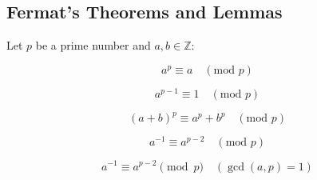 \subsection{Fermat's Theorems and Lemmas}

Let $p$ be a prime number and $a, b \in \mathbb{Z}$:

\begin{equation}
a^p \equiv a \quad (\text{mod } p)
\end{equation}

\begin{equation}
a^{p-1} \equiv 1 \quad (\text{mod } p)
\end{equation}

\begin{equation}
  (a+b)^{p} \equiv a^{p} + b^{p} \quad (\text{mod } p)
\end{equation}

\begin{equation}
  a^{-1} \equiv a^{p-2} \quad (\text{mod } p)
\end{equation}

\begin{equation}
  a^{-1} \equiv a^{p-2} \pmod{p} 
  \quad (\gcd(a, p) = 1)
\end{equation}



